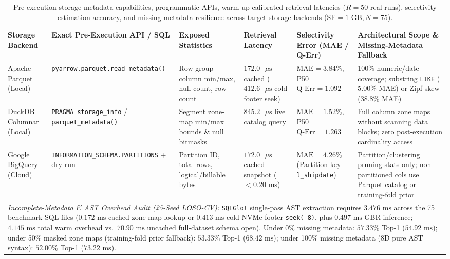 \documentclass[10pt,a4paper]{article}
\newenvironment{fitasttable}{%
  \begin{lrbox}{\asttblbox}%
}{%
  \end{lrbox}%
  \sbox{\asttblboxB}{%
    \ifdim\wd\asttblbox>0.96\textwidth
      \resizebox{0.96\textwidth}{!}{\usebox{\asttblbox}}%
    \else
      \usebox{\asttblbox}%
    \fi
  }%
  \ifdim\ht\asttblboxB>0.72\textheight
    \resizebox{!}{0.72\textheight}{\usebox{\asttblboxB}}%
  \else
    \usebox{\asttblboxB}%
  \fi
}
\begin{document}
\begingroup
\begin{table}[t!]
\centering
\caption{Pre-execution storage metadata capabilities, programmatic APIs, warm-up calibrated retrieval latencies ($R=50$ real runs), selectivity estimation accuracy, and missing-metadata resilience across target storage backends ($\text{SF}=1\text{ GB}, N=75$).}\label{tab:jbd_meta_2b}
\label{tab:metadata_scope_audit}
\footnotesize
\setlength{\tabcolsep}{4pt}
\renewcommand{\arraystretch}{1.12}
\begin{fitasttable}
\begin{tabular}{p{2.2cm}p{2.9cm}p{2.8cm}p{2.2cm}p{2.3cm}p{3.6cm}}
\hline
\textbf{Storage Backend} & \textbf{Exact Pre-Execution API / SQL} & \textbf{Exposed Statistics} & \textbf{Retrieval Latency} & \textbf{Selectivity Error (MAE / Q-Err)} & \textbf{Architectural Scope \& Missing-Metadata Fallback} \\
\hline
Apache Parquet (Local) & \texttt{pyarrow.parquet.}\newline\texttt{read\_\allowbreak{}metadata()} & Row-group column min/max, null count, row count & $172.0\text{ }\mu\text{s}$ cached ($412.6\text{ }\mu\text{s}$ cold footer seek) & $\text{MAE}=3.84\%$, P50 $\text{Q-Err}=1.092$ & 100\% numeric/date coverage; substring \texttt{LIKE} ($5.00\%$ MAE) or Zipf skew ($38.8\%$ MAE) \\
DuckDB Columnar (Local) & \texttt{PRAGMA storage\_\allowbreak{}info} / \texttt{parquet\_\allowbreak{}}\newline\texttt{metadata()} & Segment zone-map min/max bounds \& null bitmasks & $845.2\text{ }\mu\text{s}$ live catalog query & $\text{MAE}=1.52\%$, P50 $\text{Q-Err}=1.263$ & Full column zone maps without scanning data blocks; zero post-execution cardinality access \\
Google BigQuery (Cloud) & \texttt{INFORMATION\_\allowbreak{}SCHEMA.}\newline\texttt{PARTITIONS} + dry-run & Partition ID, total rows, logical/billable bytes & $172.0\text{ }\mu\text{s}$ cached snapshot ($<0.20\text{ ms}$) & $\text{MAE}=4.26\%$ (Partition key \texttt{l\_\allowbreak{}shipdate}) & Partition/clustering pruning stats only; non-partitioned cols use Parquet catalog or training-fold prior \\
\hline
\multicolumn{6}{p{16.2cm}}{\footnotesize \textit{Incomplete-Metadata \& AST Overhead Audit (25-Seed LOSO-CV):} \texttt{SQLGlot} single-pass AST extraction requires $3.476\text{ ms}$ across the 75 benchmark SQL files ($0.172\text{ ms}$ cached zone-map lookup or $0.413\text{ ms}$ cold NVMe footer \texttt{seek(-8)}, plus $0.497\text{ ms}$ GBR inference; $4.145\text{ ms}$ total warm overhead vs.\ $70.90\text{ ms}$ uncached full-dataset schema open). Under 0\% missing metadata: $57.33\%$ Top-1 ($54.92\text{ ms}$); under 50\% masked zone maps (training-fold prior fallback): $53.33\%$ Top-1 ($68.42\text{ ms}$); under 100\% missing metadata (8D pure AST syntax): $52.00\%$ Top-1 ($73.22\text{ ms}$).} \\
\hline
\end{tabular}
\end{fitasttable}
\end{table}
\endgroup
\end{document}
